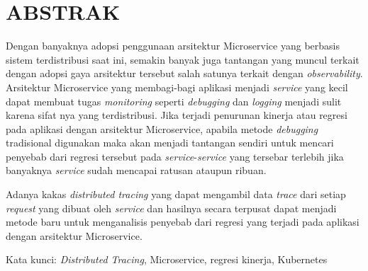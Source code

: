 \clearpage
\chapter*{ABSTRAK}

Dengan banyaknya adopsi penggunaan arsitektur Microservice yang berbasis sistem terdistribusi saat ini, semakin banyak juga tantangan yang muncul terkait dengan adopsi gaya arsitektur tersebut salah satunya terkait dengan \textit{observability}. Arsitektur Microservice yang membagi-bagi aplikasi menjadi \textit{service} yang kecil dapat membuat tugas \textit{monitoring} seperti \textit{debugging} dan \textit{logging} menjadi sulit karena sifat nya yang terdistribusi. Jika terjadi penurunan kinerja atau regresi pada aplikasi dengan arsitektur Microservice, apabila metode \textit{debugging} tradisional digunakan maka akan menjadi tantangan sendiri untuk mencari penyebab dari regresi tersebut pada \textit{service}-\textit{service} yang tersebar terlebih jika banyaknya \textit{service} sudah mencapai ratusan ataupun ribuan. 

Adanya kakas \textit{distributed tracing} yang dapat mengambil data  \textit{trace} dari setiap \textit{request} yang dibuat oleh \textit{service} dan hasilnya secara terpusat dapat menjadi metode baru untuk menganalisis penyebab dari regresi yang terjadi pada aplikasi dengan arsitektur Microservice.




\vspace{15mm}
Kata kunci: \textit{Distributed Tracing}, Microservice, regresi kinerja, Kubernetes
\clearpage